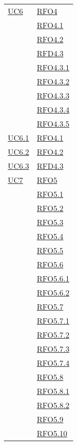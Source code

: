 \begin{longtable}{|>{\centering}m{5cm}|m{5cm}<{\centering}|}
\hyperlink{UC6}{UC6} 
& \hyperlink{RFO4}{RFO4}\\
& \hyperlink{RFO4.1}{RFO4.1}\\
& \hyperlink{RFO4.2}{RFO4.2}\\
& \hyperlink{RFD4.3}{RFD4.3}\\
& \hyperlink{RFO4.3.1}{RFO4.3.1}\\
& \hyperlink{RFO4.3.2}{RFO4.3.2}\\
& \hyperlink{RFO4.3.3}{RFO4.3.3}\\
& \hyperlink{RFO4.3.4}{RFO4.3.4}\\
& \hyperlink{RFO4.3.5}{RFO4.3.5}\\\hline

\hyperlink{UC6.1}{UC6.1} & \hyperlink{RFO4.1}{RFO4.1}\\ \hline
\hyperlink{UC6.2}{UC6.2} & \hyperlink{RFO4.2}{RFO4.2}\\ \hline
\hyperlink{UC6.3}{UC6.3} & \hyperlink{RFD4.3}{RFD4.3}\\ \hline

\hyperlink{UC7}{UC7} & \hyperlink{RFO5}{RFO5}\\
& \hyperlink{RFO5.1}{RFO5.1}\\
& \hyperlink{RFO5.2}{RFO5.2}\\
& \hyperlink{RFO5.3}{RFO5.3}\\
& \hyperlink{RFO5.4}{RFO5.4}\\
& \hyperlink{RFO5.5}{RFO5.5}\\
& \hyperlink{RFO5.6}{RFO5.6}\\
& \hyperlink{RFO5.6.1}{RFO5.6.1}\\
& \hyperlink{RFO5.6.2}{RFO5.6.2}\\
& \hyperlink{RFO5.7}{RFO5.7}\\
& \hyperlink{RFO5.7.1}{RFO5.7.1}\\
& \hyperlink{RFO5.7.2}{RFO5.7.2}\\
& \hyperlink{RFO5.7.3}{RFO5.7.3}\\
& \hyperlink{RFO5.7.4}{RFO5.7.4}\\
& \hyperlink{RFO5.8}{RFO5.8}\\
& \hyperlink{RFO5.8.1}{RFO5.8.1}\\
& \hyperlink{RFO5.8.2}{RFO5.8.2}\\
& \hyperlink{RFO5.9}{RFO5.9}\\
& \hyperlink{RFO5.10}{RFO5.10}\\ \hline


\end{longtable}
